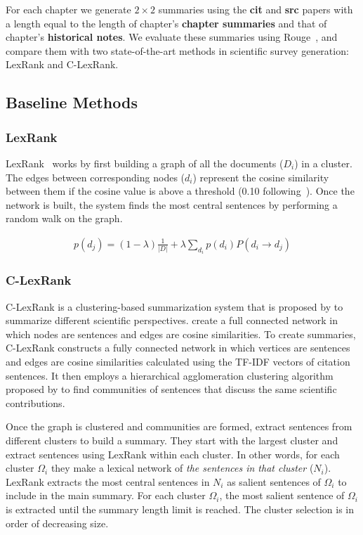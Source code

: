 For each chapter we generate $2\times 2$ summaries using the {\bf cit} and {\bf src} papers with a length equal to the length of chapter's {\bf chapter summaries} and that of chapter's {\bf historical notes}. We evaluate these summaries using Rouge~\cite{Lin2004}, and compare them with two state-of-the-art methods in scientific survey generation: LexRank and C-LexRank.

\subsection{Baseline Methods}
\vspace{-2mm}
\subsubsection{LexRank}
LexRank~\cite{Erkan&Radev04c} works by first building a graph of all
the documents ($D_i$) in a cluster. The edges between corresponding nodes ($d_i$) represent
the cosine similarity between them if the cosine value is above a threshold (0.10 following~\cite{Erkan&Radev04c}).  
Once the network is built, the system finds the most central sentences
by performing a random walk on the graph. 

{\small
\begin{eqnarray}\label{eqn:3}
p(d_j) = (1- \lambda) \frac{1}{|D|}+ \lambda\sum_{d_i}p(d_i)P(d_i\rightarrow d_j) 
\end{eqnarray}}

\subsubsection{C-LexRank}
C-LexRank is a clustering-based summarization system that is proposed by \cite{Qazvinian&Radev08a} to summarize different scientific perspectives. create a full connected network in which nodes are sentences and edges are cosine similarities.  
To create summaries, C-LexRank constructs a fully connected network in which vertices are sentences and edges are cosine similarities calculated using the TF-IDF vectors of citation sentences. 
It then employs a hierarchical agglomeration clustering algorithm proposed by \cite{Clauset04} to find communities of sentences that discuss the same scientific contributions.

Once the graph is clustered and communities are formed,  extract sentences from different clusters to build a summary.  
They start with the largest cluster and extract sentences using LexRank within each cluster.
In other words, for each cluster $\Omega_i$ they make a lexical network of \emph{the sentences in that cluster} ($N_i$). 
LexRank  extracts the most central sentences in $N_i$ as salient sentences of $\Omega_i$ to include in the main summary. 
For each cluster $\Omega_i$, the most salient sentence of $\Omega_i$ is extracted until the summary length limit is reached. The cluster selection is in order of decreasing size.

